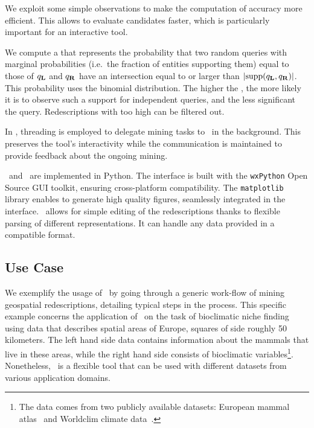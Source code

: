 We exploit some simple observations to make the computation of
accuracy more efficient. This allows to evaluate candidates faster,
which is particularly important for an interactive tool.  

We compute a
\pValue{} that represents the probability that two random queries with
marginal probabilities (i.e.\ the fraction of entities supporting
them) equal to those of $q_{\mathbf{L}}$ and $q_{\mathbf{R}}$ have an intersection
equal to or larger than $\abs{\supp(q_\iLHS, q_\iRHS)}$. This
probability uses the binomial distribution. The higher the \pValue,
the more likely it is to observe such a support for independent
queries, and the less significant the query. Redescriptions with too
high \pValue{} can be filtered out.

In \Siren, threading is employed to delegate mining tasks to \ReReMi\ in the background. This preserves the tool's
interactivity while the communication is maintained to provide feedback
about the ongoing mining.

\Siren\ and \ReReMi\ are implemented in Python.  The interface is
built with the \texttt{wxPython} Open Source GUI toolkit, ensuring
cross-platform compatibility. 
 The \texttt{matplotlib} library enables
to generate high quality figures, seamlessly integrated in the
interface.  \Siren\ allows for simple editing of the redescriptions
thanks to flexible parsing of different representations. It can handle
any data provided in a compatible format.  

\subsection{Use Case}
\label{sec:scenarios}



We exemplify the usage of \Siren\ by going through a generic work-flow
of mining geospatial redescriptions, detailing typical steps in the
process.  This specific example concerns the application of \Siren\ on
the task of bioclimatic niche finding using data that describes
spatial areas of Europe, squares of side roughly 50 kilometers.  The
left hand side data contains information about the mammals that live
in these areas, while the right hand side consists of bioclimatic
variables\footnote{The data comes from two publicly available
  datasets: European mammal atlas~\cite{mitchell-jones99atlas} and
  Worldclim climate data~\cite{hijmans05very}.}.  Nonetheless, \Siren\
is a flexible tool that can be used with different datasets from
various application domains.

